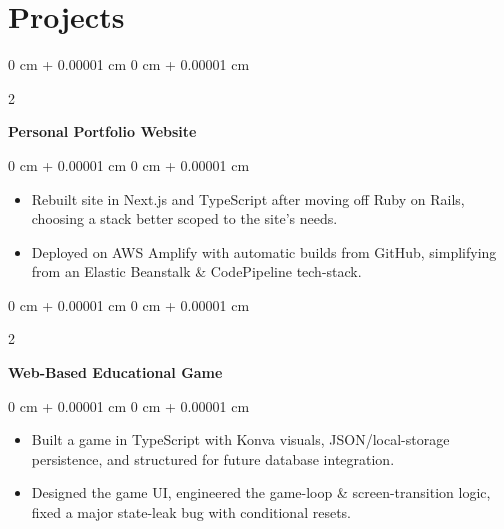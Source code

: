 \documentclass[10pt, letterpaper]{article}
\newenvironment{highlights}{
    \begin{itemize}[
        topsep=0.10 cm,
        parsep=0.10 cm,
        partopsep=0pt,
        itemsep=0pt,
        leftmargin=0 cm + 10pt
    ]
}{
    \end{itemize}
} %
\newenvironment{onecolentry}{
    \begin{adjustwidth}{
        0 cm + 0.00001 cm
    }{
        0 cm + 0.00001 cm
    }
}{
    \end{adjustwidth}
} %
\newenvironment{twocolentry}[2][]{
    \onecolentry%
    \def\secondColumn{#2}
    \setcolumnwidth{\fill, 7.0 cm}
    \begin{paracol}{2}
}{
    \switchcolumn\raggedleft\secondColumn%
    \end{paracol}
    \endonecolentry%
} %
\begin{document}
    {\color{secondaryColor}\section{Projects}}

        \begin{twocolentry}{
            \href{https://github.com/thatchereames/portfolio-site}{\color{secondaryColor}{github.com/thatchereames/portfolio-site}}
        }
            \textbf{Personal Portfolio Website}\end{twocolentry}

        \vspace{0.10 cm}
        \begin{onecolentry}
            \begin{highlights}
                \item Rebuilt site in Next.js and TypeScript after moving off Ruby on Rails, choosing a stack better scoped to the site's needs.
                \item Deployed on AWS Amplify with automatic builds from GitHub, simplifying from an Elastic Beanstalk \& CodePipeline tech-stack.
            \end{highlights}
        \end{onecolentry}
        
        \vspace{0.2 cm}

        \begin{twocolentry}{
            \href{https://github.com/thatchereames/mojo-dojo-multiply}{\color{secondaryColor}{github.com/thatchereames/mojo-dojo-multiply}}
        }
            \textbf{Web-Based Educational Game}\end{twocolentry}

        \vspace{0.10 cm}
        \begin{onecolentry}
            \begin{highlights}
                \item Built a game in TypeScript with Konva visuals, JSON/local-storage persistence, and structured for future database integration. 
                \item Designed the game UI, engineered the game-loop \& screen-transition logic, fixed a major state-leak bug with conditional resets.
            \end{highlights}
        \end{onecolentry}
        
\end{document}
